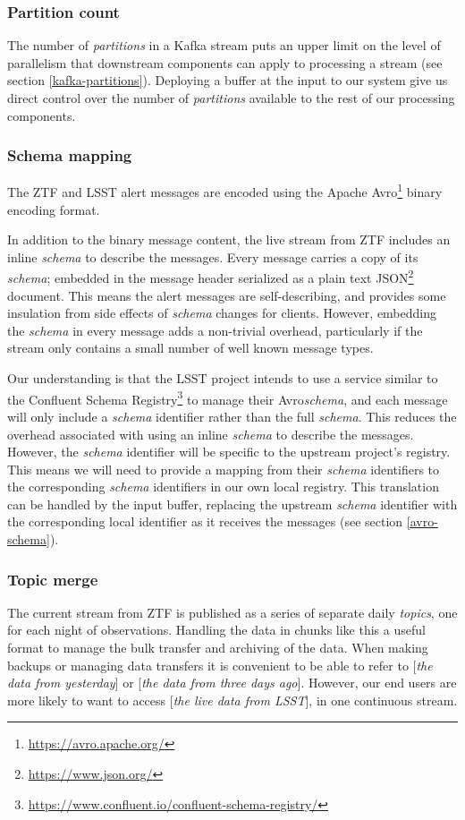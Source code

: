 \documentclass{article}
\newcommand{\json} {JSON\xspace}
\newcommand{\avro} {Avro\xspace}
\newcommand{\kafka} {Kafka\xspace}
\newcommand{\kftopics} {\textit{topics}\xspace}
\newcommand{\kfpartitions} {\textit{partitions}\xspace}
\newcommand{\apache} {Apache\xspace}
\newcommand{\confluent} {Confluent\xspace}
\newcommand{\avschema} {\textit{schema}\xspace}
\newcommand{\conschemareg} {registry\xspace}
\newcommand{\conschemaregistry} {Schema Registry\xspace}
\newcommand{\serzed}    {serialized\xspace}
\newcommand{\ztf} {ZTF\xspace}
\newcommand{\lsst} {LSST\xspace}
\newcommand{\footurl}[1] {\footnote{\url{#1}}}
\begin{document}
\subsubsection{Partition count}
\label{stage-1.partition-count}
The number of \kfpartitions in a \kafka stream puts an upper limit on the level of parallelism that downstream components can apply to processing a stream (see section \ref{kafka-partitions}).
Deploying a buffer at the input to our system give us direct control over the number of \kfpartitions available to the rest of our processing components.

\subsubsection{Schema mapping}
\label{stage-1.schema-mapping}
The ZTF and LSST alert messages are encoded using the \apache\avro\footurl{https://avro.apache.org/} binary encoding format. 

In addition to the binary message content, the live stream from \ztf includes an inline \avschema to describe the messages. Every message carries a copy of its \avschema; embedded in the message header \serzed as a plain text \json\footurl{https://www.json.org/} document.
This means the alert messages are self-describing, and provides some insulation from side effects of \avschema changes for clients.
However, embedding the \avschema in every message adds a non-trivial overhead, particularly if the stream only contains a small number of well known message types.

Our understanding is that the \lsst project intends to use a service similar to the \confluent \conschemaregistry\footurl{https://www.confluent.io/confluent-schema-registry/} to manage their \avro \avschema, and each message will only include a \avschema identifier rather than the full \avschema. This reduces the overhead associated with using an inline \avschema to describe the messages. However, the \avschema identifier will be specific to the upstream project's \conschemareg. This means we will need to provide a mapping from their \avschema identifiers to the corresponding \avschema identifiers in our own local \conschemareg.
This translation can be handled by the input buffer, replacing the upstream \avschema identifier with the corresponding local identifier as it receives the messages (see section \ref{avro-schema}).

\subsubsection{Topic merge}
\label{stage-1.topic-merge}
The current stream from \ztf is published as a series of separate daily \kftopics, one for each night of observations. Handling the data in chunks like this a useful format to manage the bulk transfer and archiving of the data. When making backups or managing data transfers it is convenient to be able to refer to [\textit{the data from yesterday}] or [\textit{the data from three days ago}]. However, our end users are more likely to want to access [\textit{the live data from \lsst}], in one continuous stream.
\end{document}
